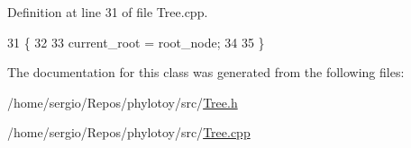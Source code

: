 Definition at line 31 of file Tree.\+cpp.


\begin{DoxyCode}
31                                  \{
32   
33   current\_root = root\_node;
34   
35 \}
\end{DoxyCode}


The documentation for this class was generated from the following files\+:\begin{DoxyCompactItemize}
\item 
/home/sergio/\+Repos/phylotoy/src/\hyperlink{Tree_8h}{Tree.\+h}\item 
/home/sergio/\+Repos/phylotoy/src/\hyperlink{Tree_8cpp}{Tree.\+cpp}\end{DoxyCompactItemize}
